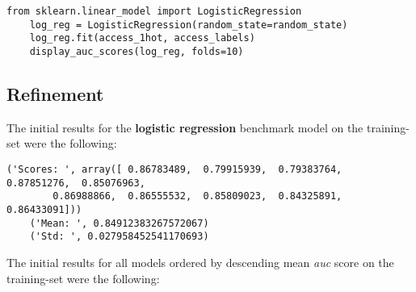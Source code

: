 \documentclass[11pt]{article}
\begin{document}
\begin{lstlisting}[frame=single]
    from sklearn.linear_model import LogisticRegression
    log_reg = LogisticRegression(random_state=random_state)
    log_reg.fit(access_1hot, access_labels)
    display_auc_scores(log_reg, folds=10)
\end{lstlisting}

\subsection{Refinement}
The initial results for the {\bf logistic regression} benchmark model on the training-set
were the following:
\begin{lstlisting}[frame=single]
    ('Scores: ', array([ 0.86783489,  0.79915939,  0.79383764,  0.87851276,  0.85076963,
        0.86988866,  0.86555532,  0.85809023,  0.84325891,  0.86433091]))
    ('Mean: ', 0.84912383267572067)
    ('Std: ', 0.027958452541170693)
\end{lstlisting}
\noindent
The initial results for all models ordered by descending mean {\it auc} score 
on the training-set were the following:
\end{document}
